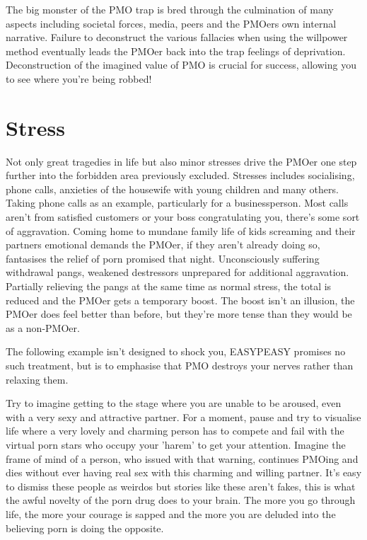 \documentclass[easypeasy.tex]{subfiles}
\begin{document}
The big monster of the PMO trap is bred through the culmination of many aspects including societal forces, media, peers and the PMOers own internal narrative. Failure to deconstruct the various fallacies when using the willpower method eventually leads the PMOer back into the trap feelings of deprivation. Deconstruction of the imagined value of PMO is crucial for success, allowing you to see where you're being robbed!

\section{Stress}

Not only great tragedies in life but also minor stresses drive the PMOer one step further into the forbidden area previously excluded. Stresses includes socialising, phone calls, anxieties of the housewife with young children and many others. Taking phone calls as an example, particularly for a businessperson. Most calls aren't from satisfied customers or your boss congratulating you, there's some sort of aggravation. Coming home to mundane family life of kids screaming and their partners emotional demands the PMOer, if they aren't already doing so, fantasises the relief of porn promised that night. Unconsciously suffering withdrawal pangs, weakened destressors unprepared for additional aggravation. Partially relieving the pangs at the same time as normal stress, the total is reduced and the PMOer gets a temporary boost. The boost isn't an illusion, the PMOer does feel better than before, but they're more tense than they would be as a non-PMOer.

The following example isn't designed to shock you, EASYPEASY promises no such treatment, but is to emphasise that PMO destroys your nerves rather than relaxing them.

Try to imagine getting to the stage where you are unable to be aroused, even with a very sexy and attractive partner. For a moment, pause and try to visualise life where a very lovely and charming person has to compete and fail with the virtual porn stars who occupy your 'harem' to get your attention. Imagine the frame of mind of a person, who issued with that warning, continues PMOing and dies without ever having real sex with this charming and willing partner. It's easy to dismiss these people as weirdos but stories like these aren't fakes, this is what the awful novelty of the porn drug does to your brain. The more you go through life, the more your courage is sapped and the more you are deluded into the believing porn is doing the opposite.
\end{document}
